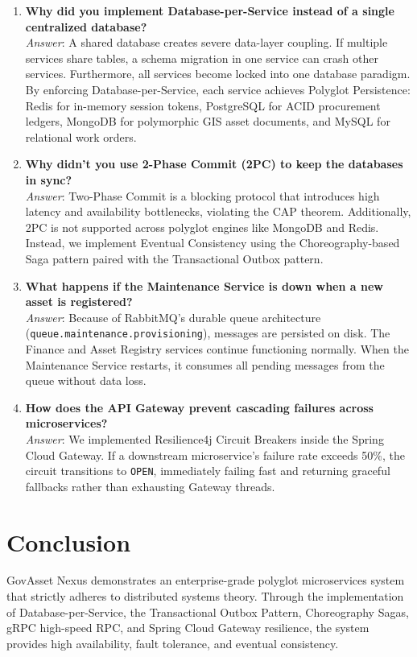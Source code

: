 \documentclass[11pt,a4paper]{article}
\begin{document}
\begin{enumerate}[leftmargin=1.5em, label=\textbf{Q\arabic*:}]
    \item \textbf{Why did you implement Database-per-Service instead of a single centralized database?}\\
    \textit{Answer}: A shared database creates severe data-layer coupling. If multiple services share tables, a schema migration in one service can crash other services. Furthermore, all services become locked into one database paradigm. By enforcing Database-per-Service, each service achieves Polyglot Persistence: Redis for in-memory session tokens, PostgreSQL for ACID procurement ledgers, MongoDB for polymorphic GIS asset documents, and MySQL for relational work orders.

    \item \textbf{Why didn't you use 2-Phase Commit (2PC) to keep the databases in sync?}\\
    \textit{Answer}: Two-Phase Commit is a blocking protocol that introduces high latency and availability bottlenecks, violating the CAP theorem. Additionally, 2PC is not supported across polyglot engines like MongoDB and Redis. Instead, we implement Eventual Consistency using the Choreography-based Saga pattern paired with the Transactional Outbox pattern.

    \item \textbf{What happens if the Maintenance Service is down when a new asset is registered?}\\
    \textit{Answer}: Because of RabbitMQ's durable queue architecture (\texttt{queue.maintenance.provisioning}), messages are persisted on disk. The Finance and Asset Registry services continue functioning normally. When the Maintenance Service restarts, it consumes all pending messages from the queue without data loss.

    \item \textbf{How does the API Gateway prevent cascading failures across microservices?}\\
    \textit{Answer}: We implemented Resilience4j Circuit Breakers inside the Spring Cloud Gateway. If a downstream microservice's failure rate exceeds 50\%, the circuit transitions to \texttt{OPEN}, immediately failing fast and returning graceful fallbacks rather than exhausting Gateway threads.
\end{enumerate}

\section{Conclusion}
GovAsset Nexus demonstrates an enterprise-grade polyglot microservices system that strictly adheres to distributed systems theory. Through the implementation of Database-per-Service, the Transactional Outbox Pattern, Choreography Sagas, gRPC high-speed RPC, and Spring Cloud Gateway resilience, the system provides high availability, fault tolerance, and eventual consistency.
\end{document}
